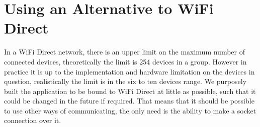 \section{Using an Alternative to WiFi Direct}
In a WiFi Direct network, there is an upper limit on the maximum number of connected devices, theoretically the limit is 254 devices in a group.
However in practice it is up to the implementation and hardware limitation on the devices in question, realistically the limit is in the six to ten devices range.
We purposely built the application to be bound to WiFi Direct at little as possible, such that it could be changed in the future if required.
That means that it should be possible to use other ways of communicating, the only need is the ability to make a socket connection over it.





